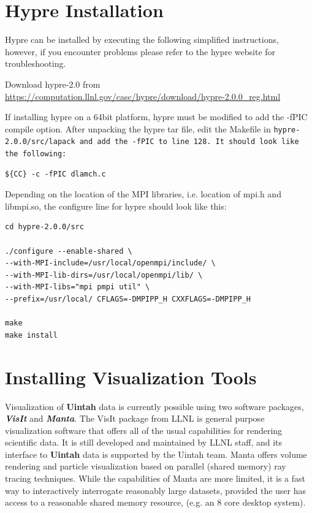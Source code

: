 \documentclass[12pt]{article}
\begin{document}
\section{Hypre Installation}

Hypre can be installed by executing the following simplified
instructions, however, if you encounter problems please refer to the
hypre website for troubleshooting.

Download hypre-2.0 from
\url{https://computation.llnl.gov/casc/hypre/download/hypre-2.0.0\_reg.html}

If installing hypre on a 64bit platform, hypre must be modified to add
the -fPIC compile option.  After unpacking the hypre tar file, edit
the Makefile in \tt hypre-2.0.0/src/lapack \normalfont and add the
-fPIC to line 128.  It should look like the following:

\begin{verbatim}
${CC} -c -fPIC dlamch.c
\end{verbatim}

Depending on the location of the MPI libraries, i.e. location of mpi.h
and libmpi.so, the configure line for hypre should look like this:
\begin{verbatim}
cd hypre-2.0.0/src

./configure --enable-shared \
--with-MPI-include=/usr/local/openmpi/include/ \
--with-MPI-lib-dirs=/usr/local/openmpi/lib/ \
--with-MPI-libs="mpi pmpi util" \
--prefix=/usr/local/ CFLAGS=-DMPIPP_H CXXFLAGS=-DMPIPP_H

make
make install
\end{verbatim}

 

\section{Installing Visualization Tools}

Visualization of \textbf{Uintah} data is currently possible using two
software packages, \textbf{\emph{VisIt}} and \textbf{\emph{Manta}}. The
VisIt package from LLNL is general purpose visualization software that
offers all of the usual capabilities for rendering scientific data.
It is still developed and maintained by LLNL staff, and its interface
to \textbf{Uintah} data is supported by the Uintah team.  Manta offers
volume rendering and particle visualization based on parallel (shared
memory) ray tracing techniques.  While the capabilities of Manta are
more limited, it is a fast way to interactively interrogate reasonably
large datasets, provided the user has access to a reasonable shared
memory resource, (e.g. an 8 core desktop system).
\end{document}
